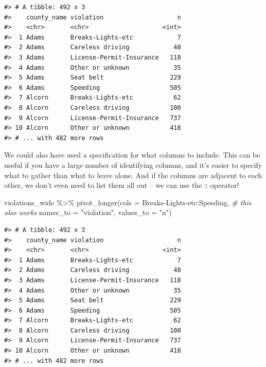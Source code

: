 \documentclass[
]{book}
\newenvironment{Shaded}{\begin{snugshade}}{\end{snugshade}}
\newcommand{\AttributeTok}[1]{\textcolor[rgb]{0.77,0.63,0.00}{#1}}
\newcommand{\CommentTok}[1]{\textcolor[rgb]{0.56,0.35,0.01}{\textit{#1}}}
\newcommand{\FunctionTok}[1]{\textcolor[rgb]{0.00,0.00,0.00}{#1}}
\newcommand{\NormalTok}[1]{#1}
\newcommand{\SpecialCharTok}[1]{\textcolor[rgb]{0.00,0.00,0.00}{#1}}
\newcommand{\StringTok}[1]{\textcolor[rgb]{0.31,0.60,0.02}{#1}}
\begin{document}
\begin{verbatim}
#> # A tibble: 492 x 3
#>    county_name violation                    n
#>    <chr>       <chr>                    <int>
#>  1 Adams       Breaks-Lights-etc            7
#>  2 Adams       Careless driving            48
#>  3 Adams       License-Permit-Insurance   118
#>  4 Adams       Other or unknown            35
#>  5 Adams       Seat belt                  229
#>  6 Adams       Speeding                   505
#>  7 Alcorn      Breaks-Lights-etc           62
#>  8 Alcorn      Careless driving           100
#>  9 Alcorn      License-Permit-Insurance   737
#> 10 Alcorn      Other or unknown           418
#> # ... with 482 more rows
\end{verbatim}

We could also have used a specification for what columns to include. This can be
useful if you have a large number of identifying columns, and it's easier to
specify what to gather than what to leave alone. And if the columns are adjacent to each other, we don't even need to list them all out -- we can use the \texttt{:} operator!

\begin{Shaded}
\begin{Highlighting}[]
\NormalTok{violations\_wide }\SpecialCharTok{\%\textgreater{}\%}
  \FunctionTok{pivot\_longer}\NormalTok{(}\AttributeTok{cols =} \StringTok{\textasciigrave{}}\AttributeTok{Breaks{-}Lights{-}etc}\StringTok{\textasciigrave{}}\SpecialCharTok{:}\NormalTok{Speeding,      }\CommentTok{\# this also works}
               \AttributeTok{names\_to =} \StringTok{"violation"}\NormalTok{, }
               \AttributeTok{values\_to =} \StringTok{"n"}\NormalTok{)}
\end{Highlighting}
\end{Shaded}

\begin{verbatim}
#> # A tibble: 492 x 3
#>    county_name violation                    n
#>    <chr>       <chr>                    <int>
#>  1 Adams       Breaks-Lights-etc            7
#>  2 Adams       Careless driving            48
#>  3 Adams       License-Permit-Insurance   118
#>  4 Adams       Other or unknown            35
#>  5 Adams       Seat belt                  229
#>  6 Adams       Speeding                   505
#>  7 Alcorn      Breaks-Lights-etc           62
#>  8 Alcorn      Careless driving           100
#>  9 Alcorn      License-Permit-Insurance   737
#> 10 Alcorn      Other or unknown           418
#> # ... with 482 more rows
\end{verbatim}
\end{document}
